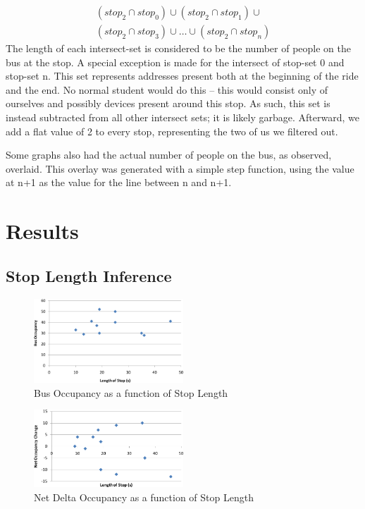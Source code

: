 \documentclass[11pt,journal,compsoc]{IEEEtran} %
\begin{document}
\begin{itemize}
\begin{multline*}
      \left(stop_2 \cap stop_0\right) \cup \left(stop_2 \cap stop_1\right) \cup \\
      \left(stop_2 \cap stop_3\right) \cup \dots \cup \left(stop_2 \cap stop_n\right)
      \end{multline*}
      The length of each intersect-set is considered to be the number of people on the bus at the stop.
      A special exception is made for the intersect of stop-set 0 and stop-set n.
      This set represents addresses present both at the beginning of the ride and the end.
      No normal student would do this -- this would consist only of ourselves and possibly devices present around this stop.
      As such, this set is instead subtracted from all other intersect sets; it is likely garbage.
      Afterward, we add a flat value of 2 to every stop, representing the two of us we filtered out.
    \end{itemize}
    Some graphs also had the actual number of people on the bus, as observed, overlaid.
    This overlay was generated with a simple step function, using the value at n+1 as the value for the line between n and n+1.

\pagebreak

\section{Results}

\subsection*{Stop Length Inference}
	\begin{figure}[!t]
      \includegraphics[width=0.5\textwidth]{occupancy}
      \caption{Bus Occupancy as a function of Stop Length} %
      \label{fig:occ}
	\end{figure}
                         
    \begin{figure}[!t]
	  \includegraphics[width=0.5\textwidth]{netdelta}
      \caption{Net Delta Occupancy as a function of Stop Length}
      \label{fig:netdelta}
	\end{figure}
\end{document}
